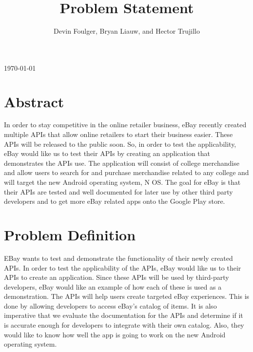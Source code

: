 \documentclass[letterpaper, 10pt, draftclsnofoot, onecolumn]{IEEEtran}
\def\name{Devin Foulger, Bryan Liauw, and Hector Trujillo }
\begin{document}
\title{ Problem Statement}
\author{\name\vspace{-10ex}}
\maketitle
\begin{center}
	\today\vspace{2ex}
\end{center}
\section*{Abstract}
	In order to stay competitive in the online retailer business, eBay recently 
	created multiple APIs that allow online retailers to start their business 
	easier. These APIs will be released to the public soon. So, in order to test 
	the applicability, eBay would like us to test their APIs by 
	creating an application that demonstrates the APIs use. The application will 
	consist of college merchandise and allow users to search for and purchase 
	merchandise related to any college and will target the new Android operating 
	system, N OS. The goal for eBay is that their APIs are tested and well documented 
	for later use by other third party developers and to get more eBay related apps 
	onto the Google Play store.

\section*{Problem Definition}
	EBay wants to test and demonstrate the functionality of their newly created APIs. 
	In order to test the applicability of the APIs, eBay would like us to their APIs to 
	create an application. Since these APIs will be used by 
	third-party developers, eBay would like an example of how each of these is used
	 as a demonstration. The APIs will help users create targeted eBay experiences.
	 This is done by allowing developers to access eBay's catalog of items. It is 
	also imperative that we evaluate the documentation for the APIs and determine 
	if it is accurate enough for developers to integrate with their own catalog. 
	Also, they would like to know how well the app is going to work on the new 
	Android operating system. 
\end{document}
